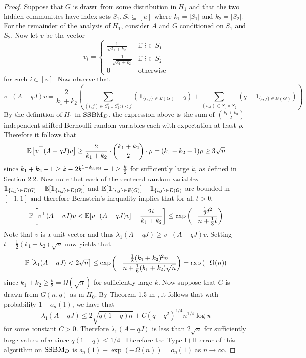 \begin{proof}
Suppose that $G$ is drawn from some distribution in $H_1$ and that the two hidden communities have index sets $S_1, S_2 \subseteq [n]$ where $k_1 = |S_1|$ and $k_2 = |S_2|$. For the remainder of the analysis of $H_1$, consider $A$ and $G$ conditioned on $S_1$ and $S_2$. Now let $v$ be the vector
$$v_i = \left\{ \begin{matrix} \frac{1}{\sqrt{k_1 + k_2}} & \text{if } i \in S_1 \\ -\frac{1}{\sqrt{k_1 + k_2}} & \text{if } i \in S_2 \\ 0 & \text{otherwise} \end{matrix} \right.$$
for each $i \in [n]$. Now observe that
$$v^\top (A - qJ) v = \frac{2}{k_1 + k_2} \left( \sum_{(i, j) \in S_1^2 \cup S_2^2 : i < j} \left( \mathbf{1}_{\{i, j\} \in E(G)} - q \right) + \sum_{(i, j) \in S_1 \times S_2} \left( q - \mathbf{1}_{\{i, j\} \in E(G)} \right) \right)$$
By the definition of $H_1$ in $\textsc{SSBM}_D$, the expression above is the sum of $\binom{k_1 + k_2}{2}$ independent shifted Bernoulli random variables each with expectation at least $\rho$. Therefore it follows that
$$\mathbb{E}\left[ v^\top (A - qJ) v \right] \ge \frac{2}{k_1 + k_2} \cdot \binom{k_1 + k_2}{2} \cdot \rho = (k_1 + k_2 - 1)\rho \ge 3\sqrt{n}$$
since $k_1 + k_2 - 1 \ge k - 2k^{1 - \delta_{\textsc{SSBM}}} - 1 \ge \frac{k}{2}$ for sufficiently large $k$, as defined in Section 2.2. Now note that each of the centered random variables $\mathbf{1}_{\{i, j\} \in E(G)} - \mathbb{E}[\mathbf{1}_{\{i, j\} \in E(G)}]$ and $\mathbb{E}[\mathbf{1}_{\{i, j\} \in E(G)}] - \mathbf{1}_{\{i, j\} \in E(G)}$ are bounded in $[-1, 1]$ and therefore Bernstein's inequality implies that for all $t > 0$,
$$\mathbb{P}\left[ v^\top (A - qJ) v < \mathbb{E}[v^\top (A - qJ) v] - \frac{2t}{k_1 + k_2} \right] \le \exp\left( - \frac{\frac{1}{2} t^2}{n + \frac{1}{3} t} \right)$$
Note that $v$ is a unit vector and thus $\lambda_1(A - qJ) \ge v^\top (A - qJ) v$. Setting $t = \frac{1}{2} (k_1 + k_2) \sqrt{n}$ now yields that
$$\mathbb{P}\left[ \lambda_1(A - qJ) < 2\sqrt{n} \right] \le \exp\left( - \frac{\frac{1}{8} (k_1 + k_2)^2 n}{n + \frac{1}{6} (k_1 + k_2) \sqrt{n}} \right) = \exp\left( - \Omega(n) \right)$$
since $k_1 + k_2 \ge \frac{k}{2} = \Omega(\sqrt{n})$ for sufficiently large $k$. Now suppose that $G$ is drawn from $G(n, q)$ as in $H_0$. By Theorem 1.5 in \cite{vu2005spectral}, it follows that with probability $1 - o_n(1)$, we have that
$$\lambda_1(A - qJ) \le 2\sqrt{q(1 - q)n} + C(q - q^2)^{1/4} n^{1/4} \log n$$
for some constant $C > 0$. Therefore $\lambda_1(A - qJ)$ is less than $2 \sqrt{n}$ for sufficiently large values of $n$ since $q(1 - q) \le 1/4$. Therefore the Type I$+$II error of this algorithm on $\textsc{SSBM}_D$ is $o_n(1) + \exp\left( - \Omega(n) \right) = o_n(1)$ as $n \to \infty$.
\end{proof}

